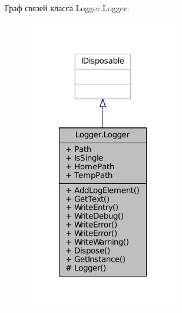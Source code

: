 Граф связей класса Logger.\+Logger\+:
\nopagebreak
\begin{figure}[H]
\begin{center}
\leavevmode
\includegraphics[width=190pt]{class_logger_1_1_logger__coll__graph}
\end{center}
\end{figure}
